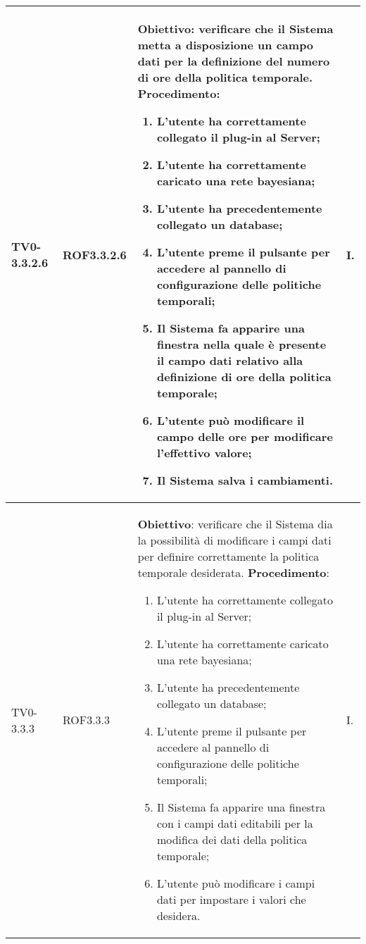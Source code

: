 \begin{longtable}{|C{.15\textwidth}|C{.13\textwidth}|m{.52\textwidth}|C{.08\textwidth}|}
TV0-3.3.2.6 & ROF3.3.2.6 &
	\textbf{Obiettivo}: verificare che il Sistema metta a disposizione un campo dati per la definizione del numero di ore della politica temporale. \newline
	\textbf{Procedimento}:
	\begin{enumerate}
		\item L'utente ha correttamente collegato il plug-in al Server;
		\item L'utente ha correttamente caricato una rete bayesiana;
		\item L'utente ha precedentemente collegato un database;
		\item L'utente preme il pulsante per accedere al pannello di configurazione delle politiche temporali;
		\item Il Sistema fa apparire una finestra nella quale è presente il campo dati relativo alla definizione di ore della politica temporale;
		\item L'utente può modificare il campo delle ore per modificare l'effettivo valore;
		\item Il Sistema salva i cambiamenti.
	\end{enumerate}
	& I. \\
\hline

TV0-3.3.3 & ROF3.3.3 &
	\textbf{Obiettivo}: verificare che il Sistema dia la possibilità di modificare i campi dati per definire correttamente la politica temporale desiderata. \newline
	\textbf{Procedimento}:
	\begin{enumerate}
		\item L'utente ha correttamente collegato il plug-in al Server;
		\item L'utente ha correttamente caricato una rete bayesiana;
		\item L'utente ha precedentemente collegato un database;
		\item L'utente preme il pulsante per accedere al pannello di configurazione delle politiche temporali;
		\item Il Sistema fa apparire una finestra con i campi dati editabili per la modifica dei dati della politica temporale;
		\item L'utente può modificare i campi dati per impostare i valori che desidera.
	\end{enumerate}
	& I. \\
\hline


\end{longtable}
